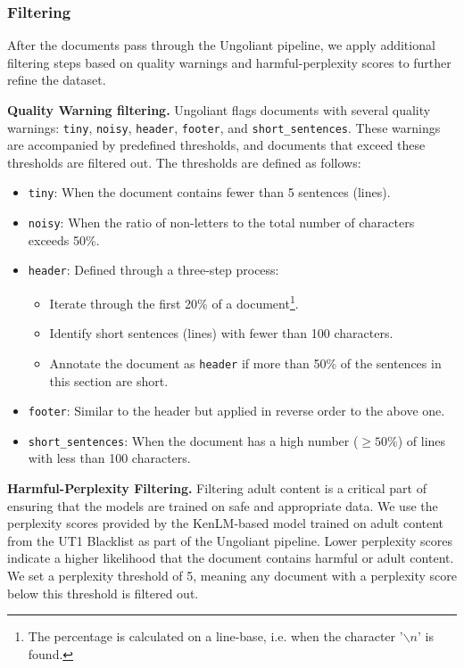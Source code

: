 \subsubsection{Filtering}
\label{sec:pipelines.web.filtering}

After the documents pass through the Ungoliant pipeline, we apply additional filtering steps based on quality warnings and harmful-perplexity scores to further refine the dataset.


\textbf{Quality Warning filtering.} Ungoliant flags documents with several quality warnings: \texttt{tiny}, \texttt{noisy}, \texttt{header}, \texttt{footer}, and \texttt{short\_sentences}. These warnings are accompanied by predefined thresholds, and documents that exceed these thresholds are filtered out. The thresholds are defined as follows:
 \begin{itemize}
     \item \texttt{tiny}: When the document contains fewer than 5 sentences (lines).
     \item \texttt{noisy}:  When the ratio of non-letters to the total number of characters exceeds 50\%.
     \item \texttt{header}: Defined through a three-step process:
     \begin{itemize}
        \item Iterate through the first 20\% of a document\footnote{The percentage is calculated on a line-base,  i.e. when the character '$\backslash n$' is found.}. 
         \item Identify short sentences (lines) with fewer than 100 characters.
         \item Annotate the document as \texttt{header} if more than 50\% of the sentences in this section are short.

     \end{itemize}
     \item \texttt{footer}: Similar to the header but applied in reverse order to the above one.

     \item \texttt{short\_sentences}: When the document has a high number ($\ge 50\%$) of lines with less than 100 characters. 
 \end{itemize}

\textbf{Harmful-Perplexity Filtering.}
Filtering adult content is a critical part of ensuring that the models are trained on safe and appropriate data. We use the perplexity scores provided by the KenLM-based model trained on adult content from the UT1 Blacklist \cite{jansen_tong_etal2022} as part of the Ungoliant pipeline. Lower perplexity scores indicate a higher likelihood that the document contains harmful or adult content. We set a perplexity threshold of 5, meaning any document with a perplexity score below this threshold is filtered out.


